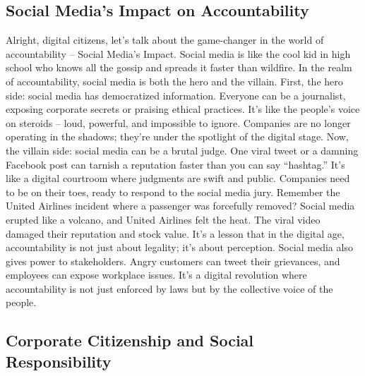 \documentclass[
  letterpaper,
  DIV=11,
  numbers=noendperiod]{scrreprt}
\begin{document}
\subsection{Social Media's Impact on
Accountability}\label{social-medias-impact-on-accountability}

Alright, digital citizens, let's talk about the game-changer in the
world of accountability -- Social Media's Impact. Social media is like
the cool kid in high school who knows all the gossip and spreads it
faster than wildfire. In the realm of accountability, social media is
both the hero and the villain. First, the hero side: social media has
democratized information. Everyone can be a journalist, exposing
corporate secrets or praising ethical practices. It's like the people's
voice on steroids -- loud, powerful, and impossible to ignore. Companies
are no longer operating in the shadows; they're under the spotlight of
the digital stage. Now, the villain side: social media can be a brutal
judge. One viral tweet or a damning Facebook post can tarnish a
reputation faster than you can say ``hashtag.'' It's like a digital
courtroom where judgments are swift and public. Companies need to be on
their toes, ready to respond to the social media jury. Remember the
United Airlines incident where a passenger was forcefully removed?
Social media erupted like a volcano, and United Airlines felt the heat.
The viral video damaged their reputation and stock value. It's a lesson
that in the digital age, accountability is not just about legality; it's
about perception. Social media also gives power to stakeholders. Angry
customers can tweet their grievances, and employees can expose workplace
issues. It's a digital revolution where accountability is not just
enforced by laws but by the collective voice of the people.

\subsection{Corporate Citizenship and Social
Responsibility}\label{corporate-citizenship-and-social-responsibility}
\end{document}
